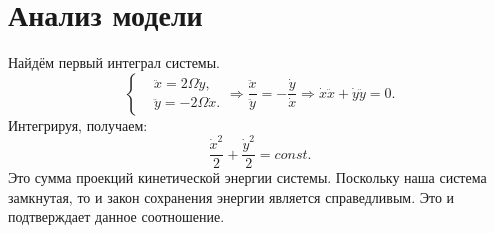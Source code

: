 \section{Анализ модели}
    Найдём первый интеграл системы.
    \[
        \left\{ \begin{split}
            & \ddot{x} = 2 \Omega \dot{y}, \\
            & \ddot{y} = -2\Omega \dot{x}.
        \end{split} \right.
        \Rightarrow
        \frac{\ddot{x}}{\ddot{y}} = - \frac{\dot{y}}{\dot{x}}
        \Rightarrow \dot{x} \ddot{x} + \dot{y} \ddot{y} = 0.
    \]
    Интегрируя, получаем:
    \[
        \frac{\dot{x}^2}{2} + \frac{\dot{y}^2}{2} = const.
    \]
    Это сумма проекций кинетической энергии системы. Поскольку наша система замкнутая, то и закон сохранения энергии является справедливым. Это и подтверждает данное соотношение.